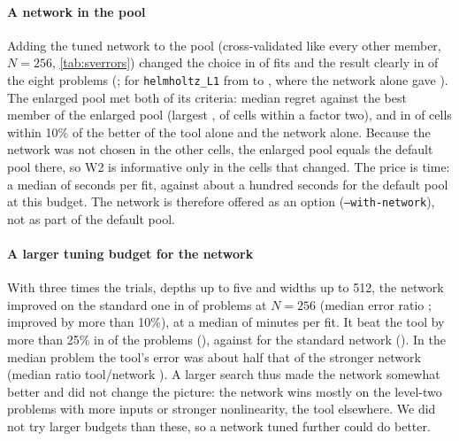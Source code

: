 \paragraph{A network in the pool} Adding the tuned network to the pool (cross-validated like every other member, $N=256$, \cref{tab:sverrors}) changed the choice in \SvWSelNet{} of \SvWJobs{} fits and the result clearly in \SvWChanged{} of the eight problems (\SvWChangedNames; for \texttt{helmholtz\_L1} from \SvWHelmTool{} to \SvWHelmBoth, where the network alone gave \SvWHelmNet). The enlarged pool met both of its criteria: median regret \SvWoneMedian{} against the best member of the enlarged pool (largest \SvWoneMax, \SvWoneShare{} of cells within a factor two), and in \SvWtwoK{} of \SvWtwoN{} cells within 10\% of the better of the tool alone and the network alone. Because the network was not chosen in the other cells, the enlarged pool equals the default pool there, so W2 is informative only in the \SvWChanged{} cells that changed. The price is time: a median of \SvWSec{} seconds per fit, against about a hundred seconds for the default pool at this budget. The network is therefore offered as an option (\texttt{--with-network}), not as part of the default pool.
\paragraph{A larger tuning budget for the network} With three times the trials, depths up to five and widths up to 512, the network improved on the standard one in \SvSfiveBetter{} of \SvSfiveN{} problems at $N=256$ (median error ratio \SvSfiveRatio; \SvSfiveBetterOneZero{} improved by more than 10\%), at a median of \SvSfiveSec{} minutes per fit. It beat the tool by more than 25\% in \SvSfiveStr{} of the \SvSfiveN{} problems (\SvSfiveWins), against \SvSfiveStd{} for the standard network (\SvSfiveStdwins). In the median problem the tool's error was about half that of the stronger network (median ratio tool/network \SvSfiveToolratio). A larger search thus made the network somewhat better and did not change the picture: the network wins mostly on the level-two problems with more inputs or stronger nonlinearity, the tool elsewhere. We did not try larger budgets than these, so a network tuned further could do better.
